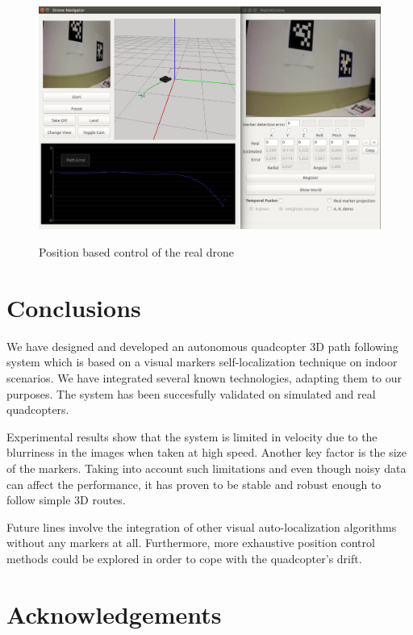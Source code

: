 \documentclass{styles/svproc}
\begin{document}
	\begin{figure}[h!]
          \begin{center}
            {\includegraphics[width=12cm]{appcapture.png}}
          \end{center}
          \caption{Position based control of the real drone}
          \label{fig:realnavigation}
	\end{figure}
        

\section{Conclusions}

	We have designed and developed an autonomous quadcopter 3D path following system which is based on a visual markers self-localization technique on indoor scenarios. We have integrated several known technologies, adapting them to our purposes. The system has been succesfully validated on simulated and real quadcopters.

	Experimental results show that the system is limited in velocity due to the blurriness in the images when taken at high speed. Another key factor is the size of the markers. Taking into account such limitations and even though noisy data can affect the performance, it has proven to be stable and robust enough to follow simple 3D routes.

        Future lines involve the integration of other visual auto-localization algorithms without any markers at all. Furthermore, more exhaustive position control methods could be explored in order to cope with the quadcopter's drift.

        \section*{Acknowledgements}
\end{document}
